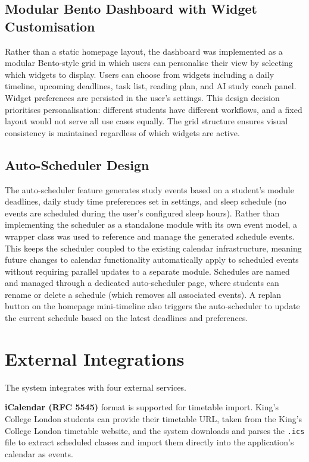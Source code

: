 \subsection{Modular Bento Dashboard with Widget Customisation}

Rather than a static homepage layout, the dashboard was implemented as a modular Bento-style grid in which users can personalise their view by selecting which widgets to display. Users can choose from widgets including a daily timeline, upcoming deadlines, task list, reading plan, and AI study coach panel. Widget preferences are persisted in the user's settings. This design decision prioritises personalisation: different students have different workflows, and a fixed layout would not serve all use cases equally. The grid structure ensures visual consistency is maintained regardless of which widgets are active.

\subsection{Auto-Scheduler Design}

The auto-scheduler feature generates study events based on a student's module deadlines, daily study time preferences set in settings, and sleep schedule (no events are scheduled during the user's configured sleep hours). Rather than implementing the scheduler as a standalone module with its own event model, a wrapper class was used to reference and manage the generated schedule events. This keeps the scheduler coupled to the existing calendar infrastructure, meaning future changes to calendar functionality automatically apply to scheduled events without requiring parallel updates to a separate module. Schedules are named and managed through a dedicated auto-scheduler page, where students can rename or delete a schedule (which removes all associated events). A replan button on the homepage mini-timeline also triggers the auto-scheduler to update the current schedule based on the latest deadlines and preferences.

\section{External Integrations}
\label{sect:integrations}

The system integrates with four external services.

\textbf{iCalendar (RFC 5545)} format is supported for timetable import. King's College London students can provide their timetable URL, taken from the King's College London timetable website, and the system downloads and parses the \texttt{.ics} file to extract scheduled classes and import them directly into the application's calendar as events.

